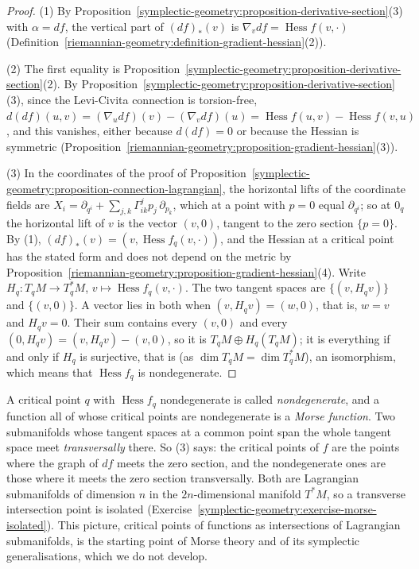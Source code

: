 \begin{proof}
(1) By Proposition~\ref{symplectic-geometry:proposition-derivative-section}(3) with $\alpha = df$, the vertical part of $(df)_*(v)$ is $\nabla_vdf = \operatorname{Hess}f(v, \cdot)$
(Definition~\ref{riemannian-geometry:definition-gradient-hessian}(2)).

(2) The first equality is Proposition~\ref{symplectic-geometry:proposition-derivative-section}(2). By Proposition~\ref{symplectic-geometry:proposition-derivative-section}(3), since the Levi-Civita
connection is torsion-free, $d(df)(u, v) = (\nabla_udf)(v) - (\nabla_vdf)(u) = \operatorname{Hess}f(u, v) - \operatorname{Hess}f(v, u)$, and this vanishes, either because $d(df) = 0$ or because the
Hessian is symmetric (Proposition~\ref{riemannian-geometry:proposition-gradient-hessian}(3)).

(3) In the coordinates of the proof of Proposition~\ref{symplectic-geometry:proposition-connection-lagrangian}, the horizontal lifts of the coordinate fields are
$X_i = \partial_{q^i} + \sum_{j,k}\Gamma^j_{ik}p_j\,\partial_{p_k}$, which at a point with $p = 0$ equal $\partial_{q^i}$; so at $0_q$ the horizontal lift of $v$ is the vector $(v, 0)$, tangent to the zero
section $\{p = 0\}$. By (1), $(df)_*(v) = (v, \operatorname{Hess}f_q(v, \cdot))$, and the Hessian at a critical point has the stated form and does not depend on the metric by
Proposition~\ref{riemannian-geometry:proposition-gradient-hessian}(4). Write $H_q \colon T_qM \to T^*_qM$, $v \mapsto \operatorname{Hess}f_q(v, \cdot)$. The two tangent spaces are $\{(v, H_qv)\}$ and
$\{(v, 0)\}$. A vector lies in both when $(v, H_qv) = (w, 0)$, that is, $w = v$ and $H_qv = 0$. Their sum contains every $(v, 0)$ and every $(0, H_qv) = (v, H_qv) - (v, 0)$, so it is
$T_qM \oplus H_q(T_qM)$; it is everything if and only if $H_q$ is surjective, that is (as $\dim T_qM = \dim T^*_qM$), an isomorphism, which means that $\operatorname{Hess}f_q$ is nondegenerate.
\end{proof}

\begin{remark}\label{symplectic-geometry:remark-graph-differential}
A critical point $q$ with $\operatorname{Hess}f_q$ nondegenerate is called \emph{nondegenerate}, and a function all of whose critical points are nondegenerate is a \emph{Morse function}. Two submanifolds
whose tangent spaces at a common point span the whole tangent space meet \emph{transversally} there. So (3) says: the critical points of $f$ are the points where the graph of $df$ meets the zero section,
and the nondegenerate ones are those where it meets the zero section transversally. Both are Lagrangian submanifolds of dimension $n$ in the $2n$-dimensional manifold $T^*M$, so a transverse
intersection point is isolated (Exercise~\ref{symplectic-geometry:exercise-morse-isolated}). This picture, critical points of functions as intersections of Lagrangian submanifolds, is the starting point
of Morse theory and of its symplectic generalisations, which we do not develop.
\end{remark}

